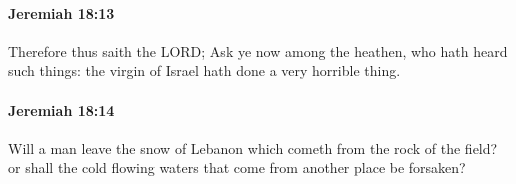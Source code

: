 		\paragraph{Jeremiah 18:13} %
			\label{JEREMIAH-18-13}

			Therefore thus saith the LORD; Ask ye now among the heathen, who hath heard such things: the virgin of Israel hath done a very horrible thing.


		\paragraph{Jeremiah 18:14} %
			\label{JEREMIAH-18-14}

			Will a man leave the snow of Lebanon which cometh from the rock of the field? or shall the cold flowing waters that come from another place be forsaken?


